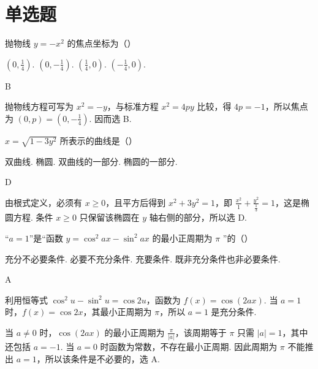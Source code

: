 \section{单选题}
\begin{problem}
抛物线 \( y = -x^{2} \) 的焦点坐标为（\quad）

\choices
    {\(\left(0, \frac{1}{4}\right)\).}
    {\(\left(0, -\frac{1}{4}\right)\).}
    {\(\left(\frac{1}{4}, 0\right)\).}
    {\(\left(-\frac{1}{4},0\right)\).}
\end{problem}

\begin{answer}
B
\end{answer}

\begin{solution}
抛物线方程可写为 \(x^2=-y\)，与标准方程 \(x^2=4py\) 比较，得 \(4p=-1\)，所以焦点为 \((0,p)=\left(0,-\frac14\right)\). 因而选 B.
\end{solution}

\begin{problem}
\(x = \sqrt{1 - 3y^2}\) 所表示的曲线是（\quad）

\choices
    {双曲线.}
    {椭圆.}
    {双曲线的一部分.}
    {椭圆的一部分.}
\end{problem}

\begin{answer}
D
\end{answer}

\begin{solution}
由根式定义，必须有 \(x\geqslant0\)，且平方后得到 \(x^2+3y^2=1\)，即 \(\frac{x^2}{1}+\frac{y^2}{\frac{1}{3}}=1\)，这是椭圆方程. 条件 \(x\geqslant0\) 只保留该椭圆在 \(y\) 轴右侧的部分，所以选 D.
\end{solution}

\begin{problem}
“\(a=1\)”是“函数 \( y=\cos^{2}ax-\sin^{2}ax \) 的最小正周期为 \( \pi \) ”的（\quad）

\choices
    {充分不必要条件.}
    {必要不充分条件.}
    {充要条件.}
    {既非充分条件也非必要条件.}
\end{problem}

\begin{answer}
A
\end{answer}

\begin{solution}
利用恒等式 \(\cos^2u-\sin^2u=\cos2u\)，函数为 \(f(x)=\cos(2ax)\). 当 \(a=1\) 时，\(f(x)=\cos2x\)，其最小正周期为 \(\pi\)，所以 \(a=1\) 是充分条件.

当 \(a\neq0\) 时，\(\cos(2ax)\) 的最小正周期为 \(\frac\pi{|a|}\)，该周期等于 \(\pi\) 只需 \(|a|=1\)，其中还包括 \(a=-1\). 当 \(a=0\) 时函数为常数，不存在最小正周期. 因此周期为 \(\pi\) 不能推出 \(a=1\)，所以该条件是不必要的，选 A.
\end{solution}

